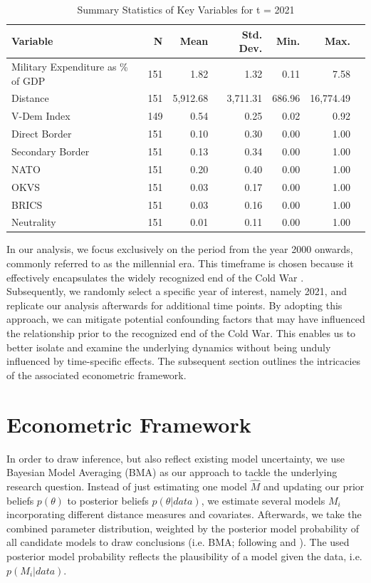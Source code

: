 \documentclass[12pt,a4paper]{article}
\begin{document}
\begin{table}[h]
\label{t:1}
\caption{Summary Statistics of Key Variables for t = 2021}
\begin{tabular}{lrrrrrr}
\hline \hline
Variable & N & Mean & Std. Dev. & Min. & Max. \\ \hline
Military Expenditure as \% of GDP & 151 & 1.82 & 1.32 & 0.11 & 7.58 \\
Distance &   151  &  5,912.68 &   3,711.31 & 686.96 &  16,774.49 \\
V-Dem Index & 149 & 0.54& 0.25 & 0.02 & 0.92 \\
Direct Border & 151 & 0.10 & 0.30 & 0.00 & 1.00 \\
Secondary Border & 151 & 0.13 & 0.34 & 0.00 &          1.00 \\
NATO & 151& 0.20 & 0.40 & 0.00 & 1.00 \\         
OKVS & 151 & 0.03  & 0.17 & 0.00 & 1.00 \\
BRICS & 151  & 0.03 & 0.16 & 0.00 & 1.00 \\          
Neutrality & 151   &  0.01 &   0.11 & 0.00 & 1.00 \\     \hline\hline
\end{tabular}
\end{table}
 
In our analysis, we focus exclusively on the period from the year 2000 onwards, commonly referred to as the millennial era. This timeframe is chosen because it effectively encapsulates the widely recognized end of the Cold War \citep{gray2005}. Subsequently, we randomly select a specific year of interest, namely 2021, and replicate our analysis afterwards for additional time points. By adopting this approach, we can mitigate potential confounding factors that may have influenced the relationship prior to the recognized end of the Cold War. This enables us to better isolate and examine the underlying dynamics without being unduly influenced by time-specific effects. The subsequent section outlines the intricacies of the associated econometric framework.
 
\section{Econometric Framework}
In order to draw inference, but also reflect existing model uncertainty, we use Bayesian Model Averaging (BMA) as our approach to tackle the underlying research question.  Instead of just estimating one model $\hat{M}$ and updating our prior beliefs $p(\theta)$ to posterior beliefs $p(\theta \vert data)$, we estimate several models $M_{i}$ incorporating different distance measures and covariates. Afterwards, we take the combined parameter distribution, weighted by the posterior model probability of all candidate models to draw conclusions (i.e. BMA; following \citealp{jeffreys1939} and \citealp{jevons1874}). The used posterior model probability reflects the plausibility of a model given the data, i.e. $p(M_{i} \vert data)$.
\end{document}
